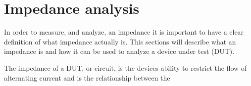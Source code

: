 \section{Impedance analysis} \label{sec:ImpedanceAnalysis}
In order to measure, and analyze, an impedance it is important to have a clear definition of what impedance actually is. This sections will describe what an impedance is and how it can be used to analyze a device under test (DUT).

The impedance of a DUT, or circuit, is the devices ability to restrict the flow of alternating current and is the relationship between the 